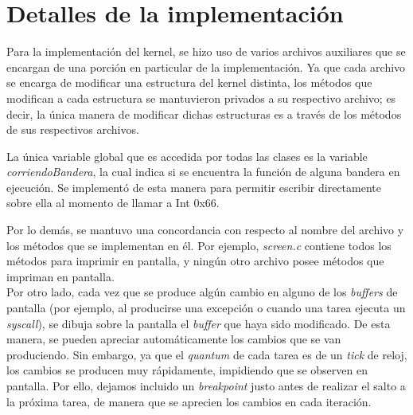 \documentclass[a4paper]{article}
\begin{document}
\thispagestyle{empty}

\maketitle
\newpage

\thispagestyle{empty}
\vfill

\thispagestyle{empty}
\vspace{3cm}
\newpage


\newpage

\section{Detalles de la implementación}

Para la implementación del kernel, se hizo uso de varios archivos auxiliares que se encargan de una porción en particular de la implementación. Ya que cada archivo se encarga de modificar una estructura del kernel distinta, los métodos que modifican a cada estructura se mantuvieron privados a su respectivo archivo; es decir, la única manera de modificar dichas estructuras es a través de los métodos de sus respectivos archivos.

La única variable global que es accedida por todas las clases es la variable \textit{corriendoBandera}, la cual indica si se encuentra la función de alguna bandera en ejecución. Se implementó de esta manera para permitir escribir directamente sobre ella al momento de llamar a Int 0x66.


Por lo demás, se mantuvo una concordancia con respecto al nombre del archivo y los métodos que se implementan en él. Por ejemplo, \textit{screen.c} contiene todos los métodos para imprimir en pantalla, y ningún otro archivo posee métodos que impriman en pantalla.
\\

Por otro lado, cada vez que se produce algún cambio en alguno de los \textit{buffers} de pantalla (por ejemplo, al producirse una excepción o cuando una tarea ejecuta un \textit{syscall}), se dibuja sobre la pantalla el \textit{buffer} que haya sido modificado. De esta manera, se pueden apreciar automáticamente los cambios que se van produciendo. Sin embargo, ya que el \textit{quantum} de cada tarea es de un \textit{tick} de reloj, los cambios se producen muy rápidamente, impidiendo que se observen en pantalla. Por ello, dejamos incluido un \textit{breakpoint} justo antes de realizar el salto a la próxima tarea, de manera que se aprecien los cambios en cada iteración.
\\
\end{document}
